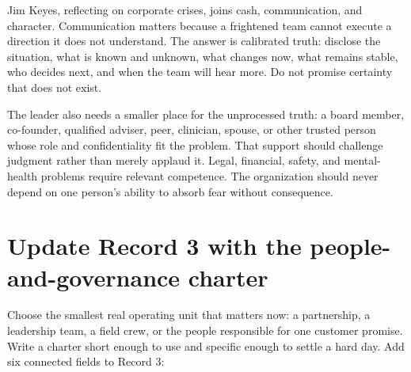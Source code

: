 Jim Keyes, reflecting on corporate crises, joins cash, communication, and
character. Communication matters because a frightened team cannot execute a
direction it does not understand. The answer is calibrated truth: disclose the
situation, what is known and unknown, what changes now, what remains stable,
who decides next, and when the team will hear more. Do not promise certainty
that does not exist.

The leader also needs a smaller place for the unprocessed truth: a board member,
co-founder, qualified adviser, peer, clinician, spouse, or other trusted person
whose role and confidentiality fit the problem. That support should challenge
judgment rather than merely applaud it. Legal, financial, safety, and mental-
health problems require relevant competence. The organization should never
depend on one person's ability to absorb fear without consequence.

\section{Update Record 3 with the people-and-governance charter}

Choose the smallest real operating unit that matters now: a partnership, a
leadership team, a field crew, or the people responsible for one customer
promise. Write a charter short enough to use and specific enough to settle a
hard day. Add six connected fields to Record 3:

